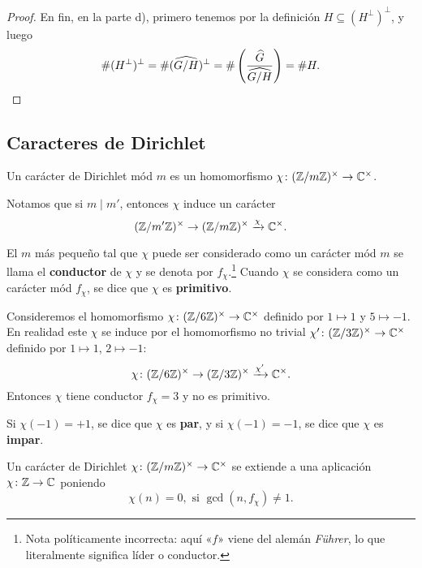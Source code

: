 \begin{proposicion}
\begin{proof}
    En fin, en la parte d), primero tenemos por la definición
    $H \subseteq (H^\perp)^\perp$, y luego
    \[ \# (H^\perp)^\perp = \# (\widehat{G/H})^\perp =
       \# \left(\frac{\widehat{G}}{\widehat{G/H}}\right) = \# H. \qedhere \]
  \end{proof}
\end{proposicion}

\subsection{Caracteres de Dirichlet}

\begin{definicion}
  Un carácter de Dirichlet mód $m$ es un homomorfismo
  $\chi\colon (\mathbb{Z}/m\mathbb{Z})^\times \to \mathbb{C}^\times$.
\end{definicion}

Notamos que si $m \mid m'$, entonces $\chi$ induce un carácter
\[ (\mathbb{Z}/m'\mathbb{Z})^\times \to (\mathbb{Z}/m\mathbb{Z})^\times \xrightarrow{\chi} \mathbb{C}^\times. \]

\begin{definicion}
  El $m$ más pequeño tal que $\chi$ puede ser considerado como un carácter mód
  $m$ se llama el \textbf{conductor} de $\chi$ y se denota por
  $f_\chi$.\footnote{Nota políticamente incorrecta: aquí «$f$» viene del alemán
    \emph{Führer}, lo que literalmente significa líder o conductor.}  Cuando
  $\chi$ se considera como un carácter mód $f_\chi$, se dice que $\chi$ es
  \textbf{primitivo}.
\end{definicion}

\begin{ejemplo}
  Consideremos el homomorfismo $\chi\colon (\mathbb{Z}/6\mathbb{Z})^\times \to \mathbb{C}^\times$
  definido por $1 \mapsto 1$ y $5 \mapsto -1$. En realidad este $\chi$ se induce
  por el homomorfismo no trivial $\chi'\colon (\mathbb{Z}/3\mathbb{Z})^\times \to \mathbb{C}^\times$
  definido por $1 \mapsto 1$, $2 \mapsto -1$:
  $$\chi\colon (\mathbb{Z}/6\mathbb{Z})^\times \to (\mathbb{Z}/3\mathbb{Z})^\times \xrightarrow{\chi'} \mathbb{C}^\times.$$
  Entonces $\chi$ tiene conductor $f_\chi = 3$ y no es primitivo.
\end{ejemplo}

\begin{definicion}
  Si $\chi (-1) = +1$, se dice que $\chi$ es \textbf{par}, y si
  $\chi (-1) = -1$, se dice que $\chi$ es \textbf{impar}.
\end{definicion}

Un carácter de Dirichlet $\chi\colon (\mathbb{Z}/m\mathbb{Z})^\times \to \mathbb{C}^\times$ se extiende
a una aplicación $\chi\colon \mathbb{Z}\to \mathbb{C}$ poniendo
$$\chi (n) = 0, \text{ si }\gcd (n,f_\chi) \ne 1.$$

